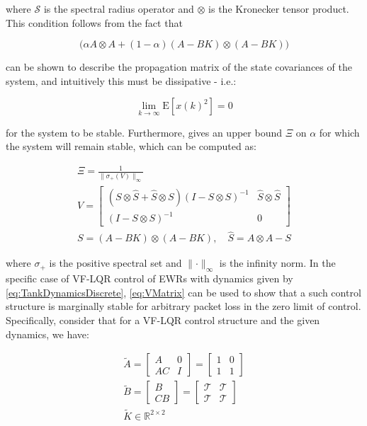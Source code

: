 where $\mathcal{S}$ is the spectral radius operator and $\otimes$ is the Kronecker tensor product. This condition follows from the fact that 

\begin{equation}
	\Big(\alpha A \otimes A + (1-\alpha)(A-BK) \otimes (A-BK) \Big)
\end{equation} 

can be shown to describe the propagation matrix of the state covariances of the system, and intuitively this must be dissipative - i.e.: 

\begin{equation}
	\lim_{k \rightarrow \infty} \text{E}[x(k)^2] = 0
\end{equation}

for the system to be stable. Furthermore, \cite{Hu2007} gives an upper bound $\Xi$ on $\alpha$ for which the system will remain stable, which can be computed as:

\begin{equation}\label{eq:VMatrix}
	\begin{gathered}
		\Xi = \frac{1}{\lVert\sigma_+(V)\rVert_\infty} \\
		V = \begin{bmatrix} (S\otimes\hat{S}+\hat{S} \otimes S)(I - S\otimes S)^{-1} & \hat{S}\otimes\hat{S} \\ (I - S\otimes S)^{-1} & 0 \end{bmatrix} \\
		S = \left(A-BK\right) \otimes \left(A-BK\right), \quad \hat{S} = A \otimes A - S
	\end{gathered}
\end{equation}

where $\sigma_+$ is the positive spectral set and $\lVert \cdot \rVert_\infty$ is the infinity norm. In the specific case of VF-LQR control of EWRs with dynamics given by \cref{eq:TankDynamicsDiscrete}, \cref{eq:VMatrix} can be used to show that a such control structure is marginally stable for arbitrary packet loss in the zero limit of control. Specifically, consider that for a VF-LQR control structure and the given dynamics, we have:

\begin{equation}\label{eq:VFormMatricesPacketLoss}
	\begin{gathered}
	\tilde{A} = \begin{bmatrix}A & 0 \\ AC & I\end{bmatrix} = \begin{bmatrix}1 & 0 \\ 1 & 1\end{bmatrix} \\
	\tilde{B} = \begin{bmatrix}B \\ CB \end{bmatrix} = \begin{bmatrix} \mathcal{T} & \mathcal{T} \\ \mathcal{T} & \mathcal{T}\end{bmatrix} \\
	\tilde{K} \in \mathbb{R}^{2\times2} 
	\end{gathered}
\end{equation}

